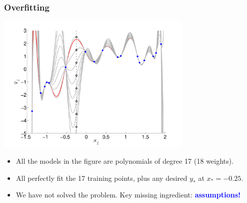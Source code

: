 \documentclass[10pt]{beamer}
\newcommand{\Blue}{\textcolor{blue}}
\begin{document}
\begin{frame}
\frametitle{Overfitting}

\centerline{\includegraphics[width=0.7\textwidth]{toy_data_polynomial_choose_your_target.pdf}}

\begin{itemize}
\item All the models in the figure are polynomials of degree 17 (18 weights).
\item All perfectly fit the 17 training points, plus any desired $y_*$ at $x_*=-0.25$.
\item We have not solved the problem. Key missing ingredient: \Blue{\bf assumptions!}
\end{itemize}


\end{frame}
\end{document}
